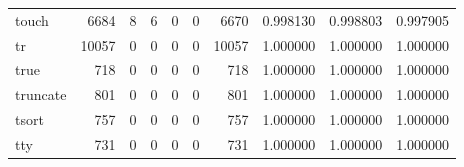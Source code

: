 \begin{tabular}{lrrrrrrrrr}
touch     &                                               6684 &                                                  8 &                                                  6 &                                                  0 &                                                  0 &                                               6670 &                                           0.998130 &                               0.998803 &                             0.997905 \\
tr        &                                              10057 &                                                  0 &                                                  0 &                                                  0 &                                                  0 &                                              10057 &                                           1.000000 &                               1.000000 &                             1.000000 \\
true      &                                                718 &                                                  0 &                                                  0 &                                                  0 &                                                  0 &                                                718 &                                           1.000000 &                               1.000000 &                             1.000000 \\
truncate  &                                                801 &                                                  0 &                                                  0 &                                                  0 &                                                  0 &                                                801 &                                           1.000000 &                               1.000000 &                             1.000000 \\
tsort     &                                                757 &                                                  0 &                                                  0 &                                                  0 &                                                  0 &                                                757 &                                           1.000000 &                               1.000000 &                             1.000000 \\
tty       &                                                731 &                                                  0 &                                                  0 &                                                  0 &                                                  0 &                                                731 &                                           1.000000 &                               1.000000 &                             1.000000 \\

\end{tabular}
